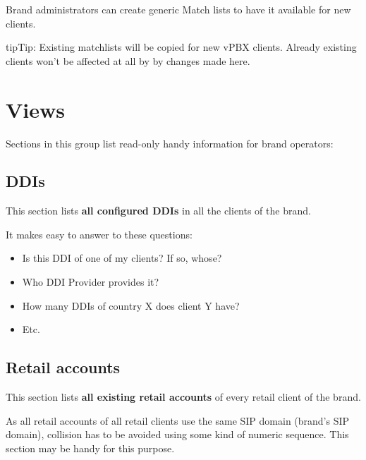 \documentclass[letterpaper,10pt,english]{sphinxmanual}
\begin{document}
Brand administrators can create generic Match lists to have it available for new clients.

\begin{notice}{tip}{Tip:}
Existing matchlists will be copied for new vPBX clients. Already existing clients won't be affected at all by
by changes made here.
\end{notice}


\section{Views}
\label{administration_portal/brand/views/index::doc}\label{administration_portal/brand/views/index:views}
Sections in this group list read-only handy information for brand operators:


\subsection{DDIs}
\label{administration_portal/brand/views/ddis:ddis}\label{administration_portal/brand/views/ddis::doc}
This section lists \textbf{all configured DDIs} in all the clients of the brand.

It makes easy to answer to these questions:
\begin{itemize}
\item {} 
Is this DDI of one of my clients? If so, whose?

\item {} 
Who DDI Provider provides it?

\item {} 
How many DDIs of country X does client Y have?

\item {} 
Etc.

\end{itemize}


\subsection{Retail accounts}
\label{administration_portal/brand/views/retail_accounts::doc}\label{administration_portal/brand/views/retail_accounts:retail-accounts}
This section lists \textbf{all existing retail accounts} of every retail client of the brand.

As all retail accounts of all retail clients use the same SIP domain (brand's SIP domain), collision has to be
avoided using some kind of numeric sequence. This section may be handy for this purpose.
\end{document}

